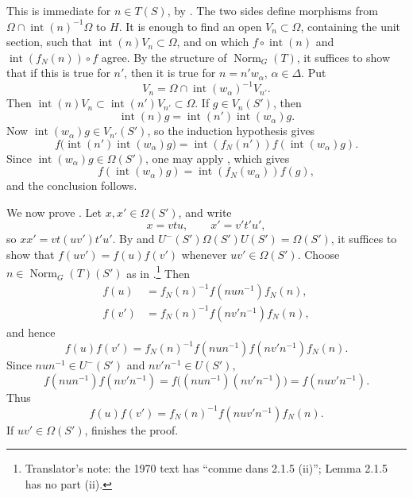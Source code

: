 This is immediate for \(n\in T(S)\), by . The two sides define
morphisms from
\(\Omega\cap\operatorname{int}(n)^{-1}\Omega\) to \(H\). It is
enough to find an open \(V_n\subset\Omega\), containing the unit
section, such that \(\operatorname{int}(n)V_n\subset\Omega\), and on
which \(f\circ\operatorname{int}(n)\) and
\(\operatorname{int}(f_N(n))\circ f\) agree. By the structure of
\(\operatorname{Norm}_G(T)\), it suffices to show that if this is true
for \(n'\), then it is true for \(n=n'w_\alpha\),
\(\alpha\in\Delta\). Put
\[
  V_n=\Omega\cap\operatorname{int}(w_\alpha)^{-1}V_{n'}.
\]
Then
\(\operatorname{int}(n)V_n\subset\operatorname{int}(n')V_{n'}
\subset\Omega\). If \(g\in V_n(S')\), then
\[
  \operatorname{int}(n)g
   =\operatorname{int}(n')\operatorname{int}(w_\alpha)g.
\]
Now \(\operatorname{int}(w_\alpha)g\in V_{n'}(S')\), so the
induction hypothesis gives
\[
  f\bigl(\operatorname{int}(n')\operatorname{int}(w_\alpha)g\bigr)
   =\operatorname{int}(f_N(n'))f(\operatorname{int}(w_\alpha)g).
\]
Since \(\operatorname{int}(w_\alpha)g\in\Omega(S')\), one may apply
, which gives
\[
  f(\operatorname{int}(w_\alpha)g)
   =\operatorname{int}(f_N(w_\alpha))f(g),
\]
and the conclusion follows.

We now prove . Let \(x,x'\in\Omega(S')\), and write
\[
  x=vtu,\qquad x'=v't'u',
\]
so \(xx'=vt(uv')t'u'\). By  and
\(U^-(S')\Omega(S')U(S')=\Omega(S')\), it suffices to show that
\(f(uv')=f(u)f(v')\) whenever \(uv'\in\Omega(S')\). Choose
\(n\in\operatorname{Norm}_G(T)(S')\) as in .\footnote{Translator's note: the 1970
text has ``comme dans 2.1.5 (ii)''; Lemma 2.1.5 has no part (ii).} Then
\[
\begin{aligned}
 f(u)&=f_N(n)^{-1}f(nun^{-1})f_N(n),\\
 f(v')&=f_N(n)^{-1}f(nv'n^{-1})f_N(n),
\end{aligned}
\]
and hence
\[
 f(u)f(v')=f_N(n)^{-1}f(nun^{-1})f(nv'n^{-1})f_N(n).
\]
Since \(nun^{-1}\in U^-(S')\) and \(nv'n^{-1}\in U(S')\),
\[
 f(nun^{-1})f(nv'n^{-1})
   =f\bigl((nun^{-1})(nv'n^{-1})\bigr)
   =f(nuv'n^{-1}).
\]
Thus
\[
  f(u)f(v')=f_N(n)^{-1}f(nuv'n^{-1})f_N(n).
\]
If \(uv'\in\Omega(S')\),  finishes the proof.


